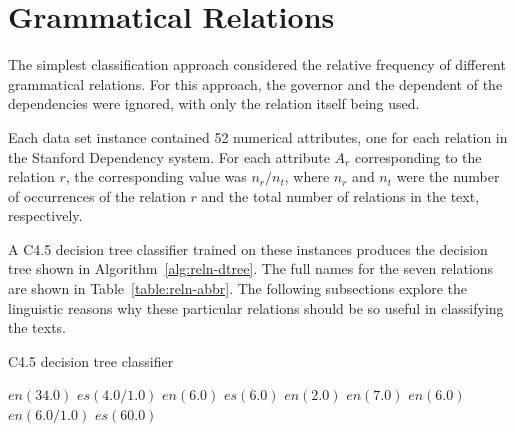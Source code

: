 \documentclass[main.tex]{subfiles}
\begin{document}
\section{Grammatical Relations}

The simplest classification approach considered the relative frequency of different grammatical relations. For this approach, the governor and the dependent of the dependencies were ignored, with only the relation itself being used. 

Each data set instance contained 52 numerical attributes, one for each relation in the Stanford Dependency system. For each attribute \(A_r\) corresponding to the relation \(r\), the corresponding value was \(n_r/n_t\), where \(n_r\) and \(n_t\) were the number of occurrences of the relation \(r\) and the total number of relations in the text, respectively.

A C4.5 decision tree classifier trained on these instances produces the decision tree shown in Algorithm~\ref{alg:reln-dtree}. The full names for the seven relations are shown in Table~\ref{table:reln-abbr}. The following subsections explore the linguistic reasons why these particular relations should be so useful in classifying the texts.

\begin{algorithm}[htbp]
\begin{spacing}{1.0}
\caption{C4.5 decision tree classifier}
{\footnotesize
\begin{algorithmic}
      \STATE $en (34.0)$
    \ELSE %
        \STATE $es (4.0/1.0)$
      \ELSE %
        \STATE $en (6.0)$
      \ENDIF %
    \ENDIF %
  \ELSE %
        \STATE $es (6.0)$
      \ELSE %
        \STATE $en (2.0)$
      \ENDIF
    \ELSE %
      \STATE $en (7.0)$
    \ENDIF %
  \ENDIF %
\ELSE
    \STATE $en (6.0)$
  \ELSE %
      \STATE $en (6.0/1.0)$
    \ELSE %
      \STATE $es (60.0)$
    \ENDIF
  \ENDIF
\ENDIF %
\end{algorithmic}
}
\label{alg:reln-dtree}
\end{spacing}
\end{algorithm}
\end{document}
